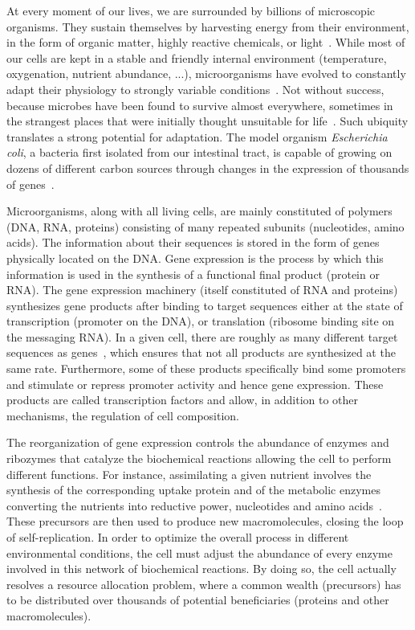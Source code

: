At every moment of our lives, we are surrounded by billions of microscopic organisms.
They sustain themselves by harvesting energy from their environment, in the form of organic matter, highly reactive chemicals, or light~\cite{madigan_biology_2006,schaechter_microbe_2006}.
While most of our cells are kept in a stable and friendly internal environment (temperature, oxygenation, nutrient abundance, ...), microorganisms have evolved to constantly adapt their physiology to strongly variable conditions~\cite{mcarthur_microbial_2006,menge_nitrogen_2012,hobbie_microbes_2013,
savageau_escherichia_1983,savageau_demand_1998,blount_unexhausted_2015,vanelsas_survival_2011}.
Not without success, because microbes have been found to survive almost everywhere, sometimes in the strangest places that were initially thought unsuitable for life~\cite{rothschild_life_2001,nicholson_transcriptomic_2012,madigan_biology_2006,schaechter_microbe_2006}.
Such ubiquity translates a strong potential for adaptation.
The model organism \textit{Escherichia coli}, a bacteria first isolated from our intestinal tract, is capable of growing on dozens of different carbon sources through changes in the expression of thousands of genes~\cite{zimmer_microcosm:_2009}.

Microorganisms, along with all living cells, are mainly constituted of polymers (DNA, RNA, proteins) consisting of many repeated subunits (nucleotides, amino acids).
The information about their sequences is stored in the form of genes physically located on the DNA.
Gene expression is the process by which this information is used in the synthesis of a functional final product (protein or RNA).
The gene expression machinery (itself constituted of RNA and proteins) synthesizes gene products after binding to target sequences either at the state of transcription (promoter on the DNA), or translation (ribosome binding site on the messaging RNA).
In a given cell, there are roughly as many different target sequences as genes~\cite{keseler_ecocyc_2013}, which ensures that not all products are synthesized at the same rate.
Furthermore, some of these products specifically bind some promoters and stimulate or repress promoter activity and hence gene expression.
These products are called transcription factors and allow, in addition to other mechanisms, the regulation of cell composition.

The reorganization of gene expression controls the abundance of enzymes and ribozymes that catalyze the biochemical reactions allowing the cell to perform different functions.
For instance, assimilating a given nutrient involves the synthesis of the corresponding uptake protein and of the metabolic enzymes converting the nutrients into reductive power, nucleotides and amino acids~\cite{schaechter_microbe_2006}.
These precursors are then used to produce new macromolecules, closing the loop of self-replication.
In order to optimize the overall process in different environmental conditions, the cell must adjust the abundance of every enzyme involved in this network of biochemical reactions.
By doing so, the cell actually resolves a resource allocation problem, where a common wealth (precursors) has to be distributed over thousands of potential beneficiaries (proteins and other macromolecules).

